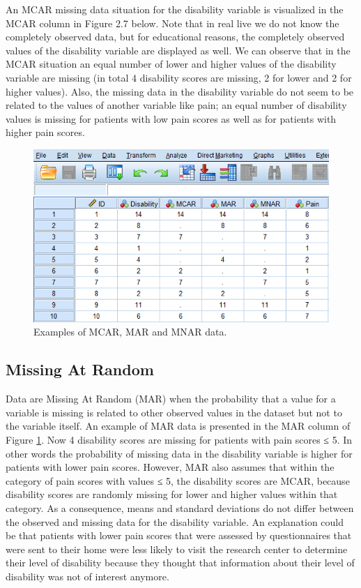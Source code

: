 \documentclass[
]{book}
\begin{document}
An MCAR missing data situation for the disability variable is visualized in the MCAR column in Figure 2.7 below. Note that in real live we do not know the completely observed data, but for educational reasons, the completely observed values of the disability variable are displayed as well. We can observe that in the MCAR situation an equal number of lower and higher values of the disability variable are missing (in total 4 disability scores are missing, 2 for lower and 2 for higher values). Also, the missing data in the disability variable do not seem to be related to the values of another variable like pain; an equal number of disability values is missing for patients with low pain scores as well as for patients with higher pain scores.

\begin{figure}

{\centering \includegraphics[width=0.9\linewidth]{images/fig2.7} 

}

\caption{Examples of MCAR, MAR and MNAR data.}\label{fig:fig2-7}
\end{figure}

\hypertarget{missing-at-random}{%
\subsection{Missing At Random}\label{missing-at-random}}

Data are Missing At Random (MAR) when the probability that a value for a variable is missing is related to other observed values in the dataset but not to the variable itself. An example of MAR data is presented in the MAR column of Figure \ref{fig:fig2-7}. Now 4 disability scores are missing for patients with pain scores ≤ 5. In other words the probability of missing data in the disability variable is higher for patients with lower pain scores. However, MAR also assumes that within the category of pain scores with values ≤ 5, the disability scores are MCAR, because disability scores are randomly missing for lower and higher values within that category. As a consequence, means and standard deviations do not differ between the observed and missing data for the disability variable. An explanation could be that patients with lower pain scores that were assessed by questionnaires that were sent to their home were less likely to visit the research center to determine their level of disability because they thought that information about their level of disability was not of interest anymore.
\end{document}
